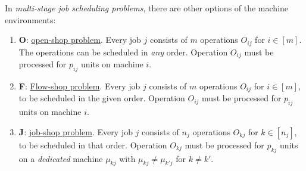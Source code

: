 \documentclass{article}
\begin{document}
In {\it multi-stage job scheduling problems}, there are other options of the machine environments:
\begin{enumerate}
	\item {\bf O}: \href{https://en.wikipedia.org/wiki/Open-shop_scheduling}{open-shop problem}. Every job $j$ consists of $m$ operations $O_{ij}$ for $i\in[m]$. The operations can be scheduled in {\it any} order. Operation $O_{ij}$ must be processed for $p_{ij}$ units on machine $i$.
	\item {\bf F}: \href{https://en.wikipedia.org/wiki/Flow-shop_scheduling}{Flow-shop problem}. Every job $j$ consists of $m$ operations $O_{ij}$ for $i\in[m]$, to be scheduled in the given order. Operation $O_{ij}$ must be processed for $p_{ij}$ units on machine $i$.
	\item {\bf J}: \href{https://en.wikipedia.org/wiki/Job-shop_scheduling}{job-shop problem}. Every job $j$ consists of $n_j$ operations $O_{kj}$ for $k\in[n_j]$, to be scheduled in that order. Operation $O_{kj}$ must be processed for $p_{kj}$ units on a {\it dedicated} machine $\mu_{kj}$ with $\mu_{kj}\ne\mu_{k'j}$ for $k\ne k'$.
\end{enumerate}

\end{document}
